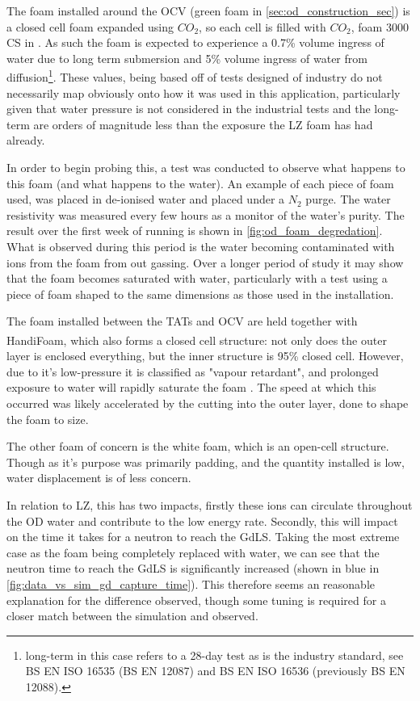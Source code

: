 \par
The foam installed around the OCV (green foam in \autoref{sec:od_construction_sec}) is a closed cell foam expanded using $CO_2$, so each cell is filled with $CO_2$, foam 3000 CS in \cite{styrodur_water_ingress_ref}.
As such the foam is expected to experience a 0.7\% volume ingress of water due to long term submersion and 5\% volume ingress of water from diffusion\footnote{long-term in this case refers to a 28-day test as is the industry standard, see BS EN ISO 16535 (BS EN 12087) and BS EN ISO 16536 (previously BS EN 12088).}.
These values, being based off of tests designed of industry do not necessarily map obviously onto how it was used in this application, particularly given that water pressure is not considered in the industrial tests and the long-term are orders of magnitude less than the exposure the LZ foam has had already.
\par
In order to begin probing this, a test was conducted to observe what happens to this foam (and what happens to the water).
An example of each piece of foam used, was placed in de-ionised water and placed under a $N_2$ purge. 
The water resistivity was measured every few hours as a monitor of the water's purity.
The result over the first week of running is shown in \autoref{fig:od_foam_degredation}.
What is observed during this period is the water becoming contaminated with ions from the foam from out gassing.
Over a longer period of study it may show that the foam becomes saturated with water, particularly with a test using a piece of foam shaped to the same dimensions as those used in the installation.
\par
The foam installed between the TATs and OCV are held together with HandiFoam\textsuperscript{\textregistered}, which also forms a closed cell structure: not only does the outer layer is enclosed everything, but the inner structure is 95\% closed cell.
However, due to it's low-pressure it is classified as "vapour retardant", and prolonged exposure to water will rapidly saturate the foam \cite{handifoam_water_ingress_ref}.
The speed at which this occurred was likely accelerated by the cutting into the outer layer, done to shape the foam to size.
\par
The other foam of concern is the white foam, which is an open-cell structure.
Though as it's purpose was primarily padding, and the quantity installed is low, water displacement is of less concern.

\par
In relation to LZ, this has two impacts, firstly these ions can circulate throughout the OD water and contribute to the low energy rate.
Secondly, this will impact on the time it takes for a neutron to reach the GdLS.
Taking the most extreme case as the foam being completely replaced with water, we can see that the neutron time to reach the GdLS is significantly increased (shown in blue in \autoref{fig:data_vs_sim_gd_capture_time}).
This therefore seems an reasonable explanation for the difference observed, though some tuning is required for a closer match between the simulation and observed.





